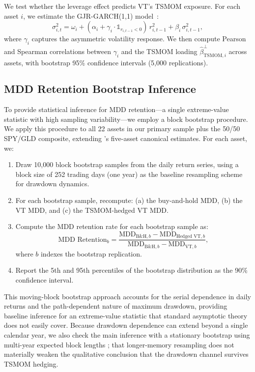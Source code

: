 We test whether the leverage effect predicts VT's TSMOM exposure. For each asset $i$, we estimate the GJR-GARCH(1,1) model~\citep{glosten1993}:
\begin{equation}
\sigma_{i,t}^2 = \omega_i + (\alpha_i + \gamma_i \cdot \mathbb{1}_{r_{i,t-1}<0}) \, r_{i,t-1}^2 + \beta_i \, \sigma_{i,t-1}^2,
\label{eq:gjr}
\end{equation}
where $\gamma_i$ captures the asymmetric volatility response. We then compute Pearson and Spearman correlations between $\gamma_i$ and the TSMOM loading $\hat{\beta}_{\text{TSMOM},i}^{\perp}$ across assets, with bootstrap 95\% confidence intervals (5,000 replications).

\subsection{MDD Retention Bootstrap Inference}

To provide statistical inference for MDD retention---a single extreme-value statistic with high sampling variability---we employ a block bootstrap procedure. We apply this procedure to all 22 assets in our primary sample plus the 50/50 SPY/GLD composite, extending 's five-asset canonical estimates. For each asset, we:

\begin{enumerate}
\item Draw 10,000 block bootstrap samples from the daily return series, using a block size of 252 trading days (one year) as the baseline resampling scheme for drawdown dynamics.
\item For each bootstrap sample, recompute: (a) the buy-and-hold MDD, (b) the VT MDD, and (c) the TSMOM-hedged VT MDD.
\item Compute the MDD retention rate for each bootstrap sample as:
\begin{equation}
\text{MDD Retention}_b = \frac{\text{MDD}_{\text{B\&H},b} - \text{MDD}_{\text{Hedged VT},b}}{\text{MDD}_{\text{B\&H},b} - \text{MDD}_{\text{VT},b}},
\label{eq:mdd_retention_boot}
\end{equation}
where $b$ indexes the bootstrap replication.
\item Report the 5th and 95th percentiles of the bootstrap distribution as the 90\% confidence interval.
\end{enumerate}

This moving-block bootstrap approach accounts for the serial dependence in daily returns and the path-dependent nature of maximum drawdown, providing baseline inference for an extreme-value statistic that standard asymptotic theory does not easily cover. Because drawdown dependence can extend beyond a single calendar year, we also check the main inference with a stationary bootstrap using multi-year expected block lengths ; that longer-memory resampling does not materially weaken the qualitative conclusion that the drawdown channel survives TSMOM hedging.


